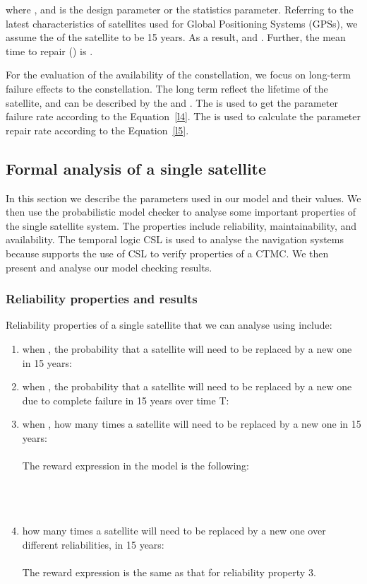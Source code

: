 \documentclass[preprint,12pt]{qrei}
\begin{document}
where , and  is the design parameter or the statistics parameter. Referring to the latest characteristics of satellites used for Global Positioning Systems (GPSs), we assume the  of the satellite to be 15 years. As a result,  and . Further, the mean time to repair () is .



For the evaluation of the availability of the constellation, we focus on long-term failure effects to the constellation. The long term reflect the lifetime of the satellite, and can be described by the  and . The  is used to get the parameter failure rate  according to the Equation~\ref{l4}. The  is used to calculate the parameter repair rate  according to the Equation~\ref{l5}.


\subsection{Formal analysis of a single satellite}

In this section we describe the parameters used in our model and their values. We then use the  probabilistic model checker to analyse some important properties of the single satellite system. The properties include reliability, maintainability, and availability. The temporal logic CSL is used to analyse the navigation systems because  supports the use of CSL to verify properties of a CTMC. We then present and analyse our model checking results.

\subsubsection{Reliability properties and results}

Reliability properties of a single satellite that we can analyse using  include:

\begin{enumerate}
\item when , the probability that a satellite will need to be replaced by a new one in 15 years:\\

\item when , the probability that a satellite will need to be replaced by a new one due to complete failure in 15 years over time T:\\

\item when , how many times a satellite will need to be replaced by a new one in 15 years:\\
\\
The reward expression in the  model is the following:\\
\\
\\
\\

\item how many times a satellite will need to be replaced by a new one over different reliabilities, in 15 years:\\
\\
The reward expression is the same as that for reliability property 3.
\end{enumerate}
\end{document}
